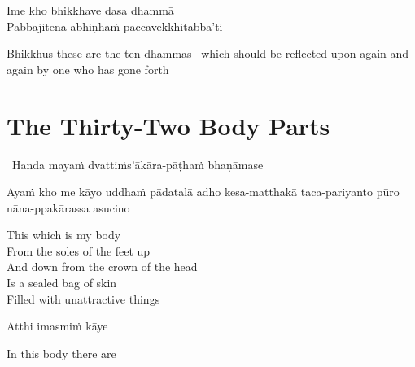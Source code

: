 Ime kho bhikkhave dasa dhammā\\
Pabbajitena abhiṇhaṁ paccavekkhitabbā'ti

\begin{english-hang-verses}
  Bhikkhus these are the ten dhammas \breathmark\ which should be reflected upon again and again by one who has gone forth
\end{english-hang-verses}

\suttaRef{[AN 10.48]}


\section{The Thirty-Two Body Parts}
\label{32-parts}

\begin{leader}
  \anglebracketleft\ \hspace{-0.5mm}Handa mayaṁ dvattiṁs'ākāra-pāṭhaṁ bhaṇāmase \hspace{-0.5mm}\anglebracketright\
\end{leader}

\begin{pali-hang}
  Ayaṁ kho me kāyo uddhaṁ pādatalā adho kesa-matthakā taca-pariyanto pūro nāna-ppakārassa asucino
\end{pali-hang}

\begin{english-verses}
  This which is my body\\
  From the soles of the feet up\\
  And down from the crown of the head\\
  Is a sealed bag of skin\\
  Filled with unattractive things
\end{english-verses}

Atthi imasmiṁ kāye

\begin{english}
  In this body there are
\end{english}

